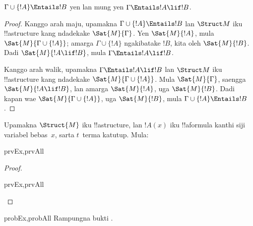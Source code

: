 \documentclass[../../../include/open-logic-section]{subfiles}
\begin{document}
\begin{thm}
$\Gamma \cup \{!A\} \Entails !B$ yen lan mung yen
$\Gamma \Entails !A \lif !B$.
\end{thm}

\begin{proof}
Kanggo arah maju, upamakna
$\Gamma \cup \{ !A \} \Entails !B$ lan
$\Struct M$ iku !!a{structure} kang ndadekake
$\Sat{M}{\Gamma}$. Yen $\Sat{M}{!A}$,
mula $\Sat{M}{\Gamma \cup \{ !A \} }$;
amarga $\Gamma \cup \{ !A \}$ ngakibatake $!B$,
kita oleh $\Sat{M}{!B}$. Dadi
$\Sat{M}{!A \lif !B}$, mula
$\Gamma \Entails !A \lif !B$.

Kanggo arah walik, upamakna
$\Gamma \Entails !A \lif !B$ lan
$\Struct M$ iku !!a{structure} kang ndadekake
$\Sat{M}{\Gamma \cup \{ !A
  \}}$. Mula $\Sat{M}{\Gamma}$, saengga
$\Sat{M}{!A \lif !B}$, lan amarga
$\Sat{M}{!A}$, uga $\Sat{M}{!B}$.
Dadi kapan wae $\Sat{M}{\Gamma \cup \{
  !A \} }$, uga $\Sat{M}{!B}$,
mula $\Gamma \cup \{ !A \} \Entails !B$.
\end{proof}

\begin{prop}
  Upamakna $\Struct{M}$ iku !!a{structure},
  lan $!A(x)$ iku !!a{formula} kanthi siji
  variabel bebas~$x$, sarta $t$~terma katutup. Mula:
  \begin{tagenumerate}{prvEx,prvAll}
  \end{tagenumerate}
\end{prop}

\begin{proof}
  \begin{tagenumerate}{prvEx,prvAll}
  \end{tagenumerate}
\end{proof}

\begin{probtag}{probEx,probAll}
  Rampungna bukti .
\end{probtag}
\end{document}
